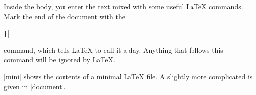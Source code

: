 Inside the body, you enter the text mixed with some useful \LaTeX{} commands.
Mark the end of the document with the
\begin{code}
\texttt||
\end{code}
command, which tells \LaTeX{} to call it a day. Anything that
follows this command will be ignored by \LaTeX.

\autoref{mini} shows the contents of a minimal \LaTeX{} file. A
slightly more complicated  is given in
\autoref{document}.

\begin{listing}
  \begin{lined}{10cm}
  \end{lined}
  \caption{A Minimal \LaTeX{} File.}\label{mini}
\end{listing}

\begin{listing}
  \begin{lined}{\textwidth}
  \end{lined}
  \caption[Example of a realistic journal article.]{Example of a realistic
    journal article. Note that all the commands you see in this example will be
    explained later.}\label{document}
\end{listing}

